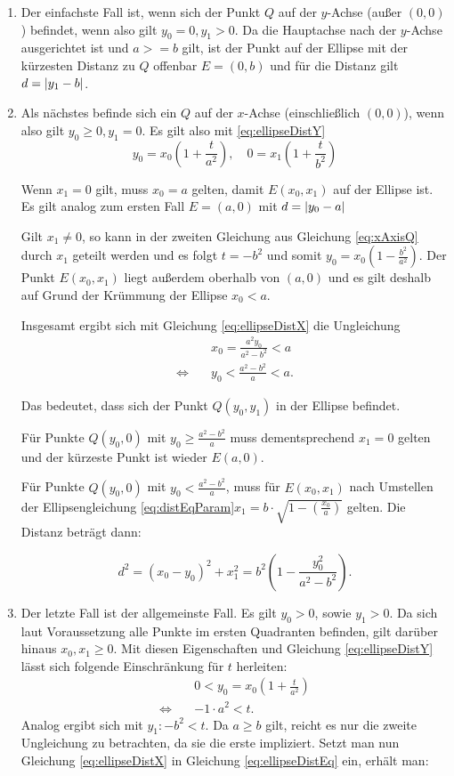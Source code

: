 \begin{enumerate}
	\item Der einfachste Fall ist, wenn sich der Punkt $Q$ auf der $y$-Achse (außer $(0,0)$) befindet, wenn also gilt $y_0 = 0, y_1 > 0$.
	Da die Hauptachse nach der $y$-Achse ausgerichtet ist und $a >= b$ gilt, ist der Punkt auf der Ellipse mit der kürzesten Distanz zu $Q$ offenbar $E = (0, b)$ und für die Distanz gilt $d = \lvert y_1 - b\rvert$.
	\item Als nächstes befinde sich ein $Q$ auf der $x$-Achse (einschließlich $(0,0)$), wenn also gilt  $y_0 \geq 0, y_1 = 0$. Es gilt also mit \ref{eq:ellipseDistY}
	\begin{equation} \label{eq:xAxisQ}
		y_0 = x_0\left(1 + \frac{t}{a^2}\right), \quad 0 = x_1\left(1 + \frac{t}{b^2}\right)
	\end{equation}

	Wenn $x_1 = 0$ gilt, muss $x_0 = a$ gelten, damit $E(x_0,x_1)$ auf der Ellipse ist. Es  gilt analog zum ersten Fall $E=(a,0)$ mit $d = \lvert y_0 - a\rvert$

	Gilt $x_1 \neq 0$, so kann in der zweiten Gleichung aus Gleichung \ref{eq:xAxisQ} durch $x_1$ geteilt werden und es folgt $t = -b^2$ und somit $y_0 = x_0\left(1 - \frac{b^2}{a^2}\right)$. Der Punkt $E(x_0,x_1)$ liegt außerdem oberhalb von $(a,0)$ und es gilt deshalb auf Grund der Krümmung der Ellipse $x_0 < a$.

	Insgesamt ergibt sich mit Gleichung \ref{eq:ellipseDistX} die Ungleichung
	\[
	\begin{aligned}
		&x_0 = \frac{a^2y_0}{a^2 - b^2} < a \\
		\Leftrightarrow\quad &y_0 < \frac{a^2 - b^2}{a} < a.
	\end{aligned}
	\]

	Das bedeutet, dass sich der Punkt $Q(y_0,y_1)$ in der Ellipse befindet.

	Für Punkte $Q(y_0,0)$ mit $y_0 \geq \frac{a^2 - b^2}{a}$ muss dementsprechend $x_1 = 0$ gelten und der kürzeste Punkt ist wieder $E(a,0)$.

	Für Punkte $Q(y_0,0)$ mit $y_0 < \frac{a^2 - b^2}{a}$, muss für $E(x_0,x_1)$ nach Umstellen der Ellipsengleichung \ref{eq:distEqParam}\quad$x_1 = b\cdot\sqrt{1-\left(\frac{x_0}{a}\right)}$ gelten.
	Die Distanz beträgt dann:

	\[
		d^2 = (x_0 - y_0)^2 + x_1^2 = b^2\left(1 - \frac{y_0^2}{a^2 - b^2}\right).
	\]
	\item Der letzte Fall ist der allgemeinste Fall. Es gilt $y_0 > 0$, sowie $y_1 > 0$. Da sich laut Voraussetzung alle Punkte im ersten Quadranten befinden, gilt darüber hinaus $x_0, x_1 \geq 0$. Mit diesen Eigenschaften und Gleichung \ref{eq:ellipseDistY} lässt sich folgende Einschränkung für $t$ herleiten:
\[
	\begin{aligned}
	& 0 < y_0 = x_0\left(1 + \frac{t}{a^2}\right)\\
	\Leftrightarrow\quad& -1\cdot a^2 < t.
	\end{aligned}
\]
	Analog ergibt sich mit $y_1\colon -b^2 < t$. Da $a\geq b$ gilt, reicht es nur die zweite Ungleichung zu betrachten, da sie die erste impliziert. Setzt man nun Gleichung \ref{eq:ellipseDistX} in Gleichung \ref{eq:ellipseDistEq} ein, erhält man:


\end{enumerate}
